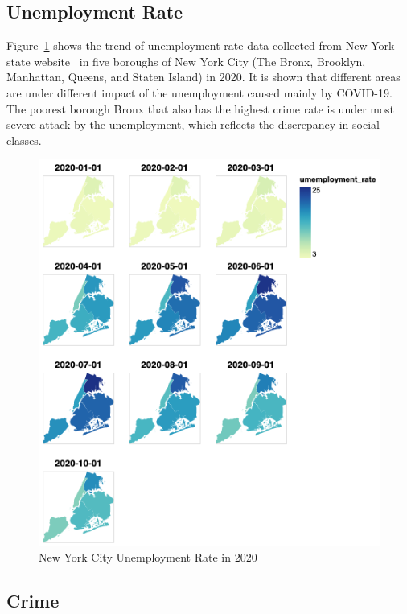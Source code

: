 \documentclass[conference]{IEEEtran}
\begin{document}
\subsection{Unemployment Rate}
 Figure~\ref{fig:unemployment_2020} shows the trend of unemployment rate data collected from New York state website~\cite{newyork2020unemployment} in five boroughs of New York City (The Bronx, Brooklyn, Manhattan, Queens, and Staten Island) in 2020. It is shown that different areas are under different impact of the unemployment caused mainly by COVID-19. The poorest borough Bronx that also has the highest crime rate is under most severe attack by the unemployment, which reflects the discrepancy in social classes.

\begin{figure}[ht!]
    \centering
    \includegraphics[width=\linewidth]{images/unemployment_boroughs_2020.png}
    \caption{New York City Unemployment Rate in 2020}
    \label{fig:unemployment_2020}
\end{figure}

\subsection{Crime}
\end{document}
